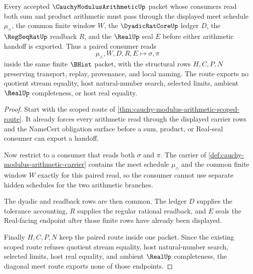 \begin{theorem}
\label{thm:cauchy-modulus-arithmetic-diagonal-meet-route}
Every accepted $\CauchyModulusArithmeticUp$ packet whose consumers read both sum and product arithmetic must pass through the displayed meet schedule $\mu_{\wedge}$, the common finite window $W$, the $\DyadicRatCoreUp$ ledger $D$, the $\RegSeqRatUp$ readback $R$, and the $\RealUp$ seal $E$ before either arithmetic handoff is exported. Thus a paired consumer reads
$$
\mu_{\wedge}, W, D, R, E \longmapsto \sigma,\pi
$$
inside the same finite $\BHist$ packet, with the structural rows $H,C,P,N$ preserving transport, replay, provenance, and local naming. The route exports no quotient stream equality, host natural-number search, selected limits, ambient $\RealUp$ completeness, or host real equality.
\end{theorem}
\begin{proof}
Start with the scoped route of \autoref{thm:cauchy-modulus-arithmetic-scoped-route}. It already forces every arithmetic read through the displayed carrier rows and the NameCert obligation surface before a sum, product, or Real-seal consumer can export a handoff.

Now restrict to a consumer that reads both $\sigma$ and $\pi$. The carrier of \autoref{def:cauchy-modulus-arithmetic-carrier} contains the meet schedule $\mu_{\wedge}$ and the common finite window $W$ exactly for this paired read, so the consumer cannot use separate hidden schedules for the two arithmetic branches.

The dyadic and readback rows are then common. The ledger $D$ supplies the tolerance accounting, $R$ supplies the regular rational readback, and $E$ seals the Real-facing endpoint after those finite rows have already been displayed.

Finally $H,C,P,N$ keep the paired route inside one packet. Since the existing scoped route refuses quotient stream equality, host natural-number search, selected limits, host real equality, and ambient $\RealUp$ completeness, the diagonal meet route exports none of those endpoints.
\end{proof}
